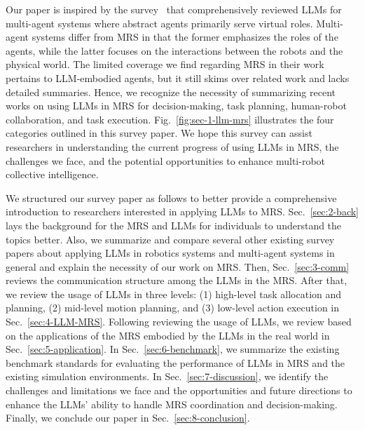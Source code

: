 Our paper is inspired by the survey~\cite{guo_large_2024} that comprehensively reviewed LLMs for multi-agent systems where abstract agents primarily serve virtual roles. Multi-agent systems differ from MRS in that the former emphasizes the roles of the agents, while the latter focuses on the interactions between the robots and the physical world. The limited coverage we find regarding MRS in their work pertains to LLM-embodied agents, but it still skims over related work and lacks detailed summaries. Hence, we recognize the necessity of summarizing recent works on using LLMs in MRS for decision-making, task planning, human-robot collaboration, and task execution. Fig.~\ref{fig:sec-1-llm-mrs} illustrates the four categories outlined in this survey paper. We hope this survey can assist researchers in understanding the current progress of using LLMs in MRS, the challenges we face, and the potential opportunities to enhance multi-robot collective intelligence.

We structured our survey paper as follows to better provide a comprehensive introduction to researchers interested in applying LLMs to MRS. Sec.~\ref{sec:2-back} lays the background for the MRS and LLMs for individuals to understand the topics better. Also, we summarize and compare several other existing survey papers about applying LLMs in robotics systems and multi-agent systems in general and explain the necessity of our work on MRS. Then, Sec.~\ref{sec:3-comm} reviews the communication structure among the LLMs in the MRS. After that, we review the usage of LLMs in three levels: (1) high-level task allocation and planning, (2) mid-level motion planning, and (3) low-level action execution in Sec.~\ref{sec:4-LLM-MRS}. Following reviewing the usage of LLMs, we review based on the applications of the MRS embodied by the LLMs in the real world in Sec.~\ref{sec:5-application}. In Sec.~\ref{sec:6-benchmark}, we summarize the existing benchmark standards for evaluating the performance of LLMs in MRS and the existing simulation environments. In Sec.~\ref{sec:7-discussion}, we identify the challenges and limitations we face and the opportunities and future directions to enhance the LLMs' ability to handle MRS coordination and decision-making. Finally, we conclude our paper in Sec.~\ref{sec:8-conclusion}.
